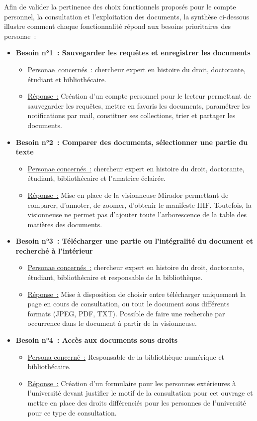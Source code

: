 Afin de valider la pertinence des choix fonctionnels proposés pour le compte personnel, la consultation et l’exploitation des documents, la synthèse ci-dessous illustre comment chaque fonctionnalité répond aux besoins prioritaires des personae :
\begin{itemize}
	\item \textbf{Besoin n°1 : Sauvegarder les requêtes et enregistrer les documents}
\begin{itemize}
	\item \uline{Personae concernés :} chercheur expert en histoire du droit, doctorante, étudiant et bibliothécaire.
\item \uline{Réponse :} Création d’un compte personnel pour le lecteur permettant de sauvegarder les requêtes, mettre en favoris les documents, paramétrer les notifications par mail, constituer ses collections, trier et partager les documents.
\end{itemize}
\item \textbf{Besoin n°2 : Comparer des documents, sélectionner une partie du texte}
\begin{itemize}
	\item \uline{Personae concernés :} chercheur expert en histoire du droit, doctorante, étudiant, bibliothécaire et l’amatrice éclairée.
\item \uline{Réponse :} Mise en place de la visionneuse Mirador permettant de comparer, d’annoter, de zoomer, d’obtenir le manifeste IIIF. Toutefois, la visionneuse ne permet pas d’ajouter toute l’arborescence de la table des matières des documents.
\end{itemize}
\item \textbf{Besoin n°3 : Télécharger une partie ou l’intégralité du document et recherché à l’intérieur}
\begin{itemize}
	\item \uline{Personae concernés :} chercheur expert en histoire du droit, doctorante, étudiant, bibliothécaire et responsable de la bibliothèque.
\item \uline{Réponse :} Mise à disposition de choisir entre télécharger uniquement la page en cours de consultation, ou tout le document sous différents formats (JPEG, PDF, TXT). Possible de faire une recherche par occurrence dans le document à partir de la visionneuse.
\end{itemize}
\item \textbf{Besoin n°4 : Accès aux documents sous droits}
\begin{itemize}
	\item \uline{Persona concerné :} Responsable de la bibliothèque numérique et bibliothécaire.
\item \uline{Réponse :} Création d’un formulaire pour les personnes extérieures à l’université devant justifier le motif de la consultation pour cet ouvrage et mettre en place des droits différenciés pour les personnes de l’université pour ce type de consultation.
\end{itemize}
\end{itemize}

